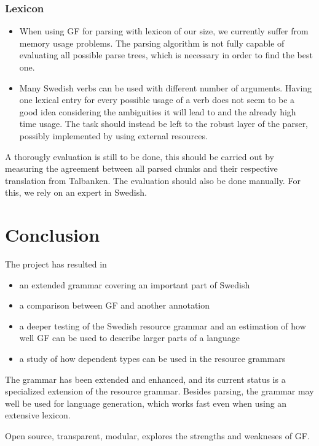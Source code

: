 \documentclass[runningheads,a4paper]{llncs}
\begin{document}
\subsubsection{Lexicon}
\label{sec:futureValency}
\begin{itemize}
\item When using GF for parsing with lexicon of our size, we currently
suffer from memory usage problems. The parsing algorithm is not fully
capable of evaluating all possible parse trees, which is necessary in order
to find the best one.

\item
Many Swedish verbs can be used with different number of arguments.
Having one lexical entry for every possible usage of a verb
does not seem to be a good idea considering
the ambiguities it will lead to and the already high time usage.
The task should instead be left to the robust layer of the parser, possibly
implemented by using external resources.

\end{itemize}

A thorougly evaluation is still to be done, this should be carried out by
measuring the agreement between all parsed chunks and their respective
translation from Talbanken. The evaluation should also be done manually.
For this, we rely on an expert in Swedish.

\section{Conclusion}

The project has resulted in
\begin{itemize}
\item an extended grammar covering an important part of Swedish
\item a comparison between GF and another annotation
\item a deeper testing of the Swedish resource grammar and an estimation
of how well GF can be used to describe larger parts of a language
\item a study of how dependent types can be used in the resource grammars
\end{itemize}

The grammar has been extended and enhanced, and its current status is
a specialized extension of the resource grammar.
Besides parsing, the grammar may well be used for language generation,
which works fast even when using an extensive lexicon.

Open source, transparent, modular, explores the strengths and weakneses
of GF.


\end{document}
